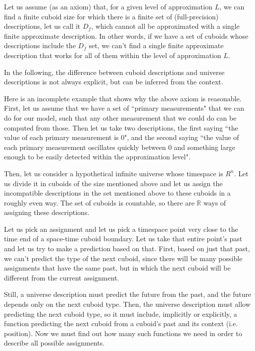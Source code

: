 \documentclass[a4paper
,draft
]{article}
\def\reale{\mathbb{R}}
\newcommand{\ghilimele}[1]{``#1"}
\begin{document}
Let us assume (as an axiom) that, for a given level of approximation $L$, we can
find a finite cuboid size for which there is a finite set of
(full-precision)
descriptions, let us call it $D_f$, which cannot all be approximated with a
single finite approximate description.
In other words, if we have a set of cuboids whose descriptions include
the $D_f$ set, we can't
find a single finite approximate description that works for all of them
within the level of approximation $L$.

In the following, the difference between
cuboid descriptions and universe descriptions is not always explicit,
but can be inferred from the context.

Here is an incomplete example that shows why the above axiom is reasonable.
First, let us assume that we have a set of
\ghilimele{primary measurements} that we
can do for our model, such that any other measurement that we could do can be
computed from those.
Then let us take two descriptions, the first saying
\ghilimele{the value of each primary measurement is $0$},
and the second saying
\ghilimele{the value of each primary measurement oscillates quickly
  between $0$ and something large enough to be easily detected within
  the approximation level}.

Then, let us consider a hypothetical infinite universe whose timespace is $R^n$.
Let us divide it in cuboids of the size mentioned above
and let us assign the incompatible
descriptions in the set mentioned above to these cuboids in a roughly even
way.
The set of cuboids is countable, so there are $\reale$ ways of
assigning these descriptions.

Let us pick an assignment and let us pick a timespace point very close to the
time end of a space-time cuboid boundary.
Let us take that entire point's past and let us try to make a prediction based
on that.
First, based on just that past, we can't predict the type of the next cuboid,
since there will be many possible assignments that have the same past, but in
which the next cuboid will be different from the current assignment.

Still, a universe description must predict the future from the past, and
the future depends only on the next cuboid type. Then, the universe
description must allow predicting the next cuboid type, so it must include,
implicitly or explicitly,
a function predicting the next cuboid from a cuboid's past
and its context (i.e. position). Now we must find out how many such functions
we need in order to describe all possible assignments.
\end{document}
